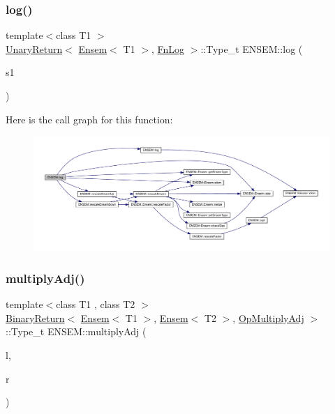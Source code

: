 \subsubsection{\texorpdfstring{log()}{log()}}
{\footnotesize\ttfamily template$<$class T1 $>$ \\
\mbox{\hyperlink{structENSEM_1_1UnaryReturn}{Unary\+Return}}$<$ \mbox{\hyperlink{classENSEM_1_1Ensem}{Ensem}}$<$ T1 $>$, \mbox{\hyperlink{structENSEM_1_1FnLog}{Fn\+Log}} $>$\+::Type\+\_\+t E\+N\+S\+E\+M\+::log (\begin{DoxyParamCaption}\item[{const \mbox{\hyperlink{classENSEM_1_1Ensem}{Ensem}}$<$ T1 $>$ \&}]{s1 }\end{DoxyParamCaption})\hspace{0.3cm}{\ttfamily [inline]}}

Here is the call graph for this function\+:\nopagebreak
\begin{figure}[H]
\begin{center}
\leavevmode
\includegraphics[width=350pt]{d1/d9e/group__eensem_gade72fe6a4a31fa197d470c2ea6ce63a8_cgraph}
\end{center}
\end{figure}
\mbox{\label{group__eensem_gae49707140467f24b7b7a50fad851d99a}} 
\subsubsection{\texorpdfstring{multiplyAdj()}{multiplyAdj()}\hspace{0.1cm}{\footnotesize\ttfamily [1/3]}}
{\footnotesize\ttfamily template$<$class T1 , class T2 $>$ \\
\mbox{\hyperlink{structENSEM_1_1BinaryReturn}{Binary\+Return}}$<$ \mbox{\hyperlink{classENSEM_1_1Ensem}{Ensem}}$<$ T1 $>$, \mbox{\hyperlink{classENSEM_1_1Ensem}{Ensem}}$<$ T2 $>$, \mbox{\hyperlink{structENSEM_1_1OpMultiplyAdj}{Op\+Multiply\+Adj}} $>$\+::Type\+\_\+t E\+N\+S\+E\+M\+::multiply\+Adj (\begin{DoxyParamCaption}\item[{const \mbox{\hyperlink{classENSEM_1_1Ensem}{Ensem}}$<$ T1 $>$ \&}]{l,  }\item[{const \mbox{\hyperlink{classENSEM_1_1Ensem}{Ensem}}$<$ T2 $>$ \&}]{r }\end{DoxyParamCaption})\hspace{0.3cm}{\ttfamily [inline]}}

